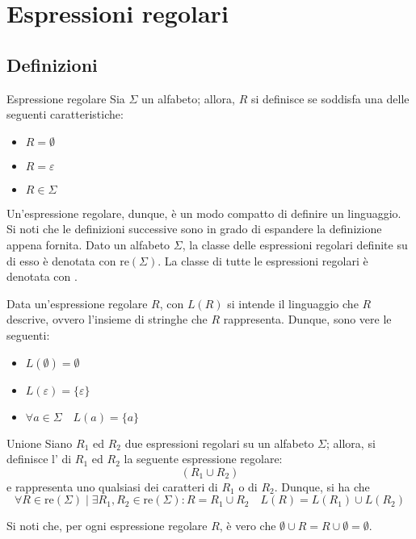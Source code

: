 \documentclass[a4paper, 12pt]{report}
\begin{document}
    \section{Espressioni regolari}

    \subsection{Definizioni}

    \begin{frameddefn}{Espressione regolare}
        Sia $\Sigma$ un alfabeto; allora, $R$ si definisce  se soddisfa una delle seguenti caratteristiche:

        \begin{itemize}
            \item $R = \emptyset$
            \item $R = \varepsilon$
            \item $R \in \Sigma$
        \end{itemize}

        Un'espressione regolare, dunque, è un modo compatto di definire un linguaggio. Si noti che le definizioni successive sono in grado di espandere la definizione appena fornita. Dato un alfabeto $\Sigma$, la classe delle espressioni regolari definite su di esso è denotata con $\mathrm{re}(\Sigma)$. La classe di tutte le espressioni regolari è denotata con \REX.

        Data un'espressione regolare $R$, con $L(R)$ si intende il linguaggio che $R$ descrive, ovvero l'insieme di stringhe che $R$ rappresenta. Dunque, sono vere le seguenti:

        \begin{itemize}
            \item $L(\emptyset) = \emptyset$
            \item $L(\varepsilon) = \{ \varepsilon \}$
            \item $\forall a \in \Sigma \quad L(a) = \{ a\}$
        \end{itemize}
    \end{frameddefn}

    \begin{frameddefn}{Unione}
        Siano $R_1$ ed $R_2$ due espressioni regolari su un alfabeto $\Sigma$; allora, si definisce l' di $R_1$ ed $R_2$ la seguente espressione regolare: $$(R_1 \cup R_2)$$ e rappresenta uno qualsiasi dei caratteri di $R_1$ o di $R_2$. Dunque, si ha che $$\forall R \in \mathrm{re}(\Sigma) \mid \exists R_1, R_2 \in \mathrm{re}(\Sigma) : R = R_1 \cup R_2 \quad L(R) = L(R_1) \cup L(R_2)$$

        Si noti che, per ogni espressione regolare $R$, è vero che $\emptyset \cup R = R \cup \emptyset = \emptyset$.
    \end{frameddefn}
\end{document}
